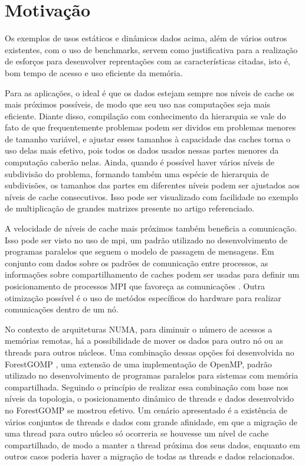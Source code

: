 \section{Motivação}
\label{sec:motivacao}

Os exemplos de usos estáticos e dinâmicos dados acima, além de vários outros existentes, com o uso de benchmarks, servem como justificativa para a realização de esforços para desenvolver reprentações com as características citadas, isto é, bom tempo de acesso e uso eficiente da memória.

Para as aplicações, o ideal é que os dados estejam sempre nos níveis de cache os mais próximos possíveis, de modo que seu uso nas computações seja mais eficiente.
Diante disso, compilação com conhecimento da hierarquia \cite{Sequoia} se vale do fato de que frequentemente problemas podem ser dividos em problemas menores de tamanho variável, e ajustar esses tamanhos à capacidade das caches torna o uso delas mais efetivo, pois todos os dados usados nessas partes menores da computação caberão nelas.
Ainda, quando é possível haver vários níveis de subdivisão do problema, formando também uma espécie de hierarquia de subdivisões, os tamanhos das partes em diferentes níveis podem ser ajustados aos níveis de cache consecutivos.
Isso pode ser visualizado com facilidade no exemplo de multiplicação de grandes matrizes presente no artigo referenciado.

A velocidade de níveis de cache mais próximos também beneficia a comunicação.
Isso pode ser visto no uso de \ac{mpi}, um padrão utilizado no desenvolvimento de programas paralelos que seguem o modelo de passagem de mensagens.
Em conjunto com dados sobre os padrões de comunicação entre processos, as informações sobre compartilhamento de caches podem ser usadas para definir um posicionamento de processos MPI que favoreça as comunicações \cite{hwloc2010}.
Outra otimização possível é o uso de metódos específicos do hardware para realizar comunicações dentro de um nó.

No contexto de arquiteturas NUMA, para diminuir o número de acessos a memórias remotas, há a possibilidade de mover os dados para outro nó ou as threads para outros núcleos.
Uma combinação dessas opções foi desenvolvida no ForestGOMP \cite{FGOMP}, uma extensão de uma implementação de OpenMP, padrão utilizado no desenvolvimento de programas paralelos para sistemas com memória compartilhada.
Seguindo o princípio de realizar essa combinação com base nos níveis da topologia, o posicionamento dinâmico de threads e dados desenvolvido no ForestGOMP se mostrou efetivo.
Um cenário apresentado é a existência de vários conjuntos de threads e dados com grande afinidade, em que a migração de uma thread para outro núcleo só ocorreria se houvesse um nível de cache compartilhado, de modo a manter a thread próxima dos seus dados, enquanto em outros casos poderia haver a migração de todas as threads e dados relacionados.

